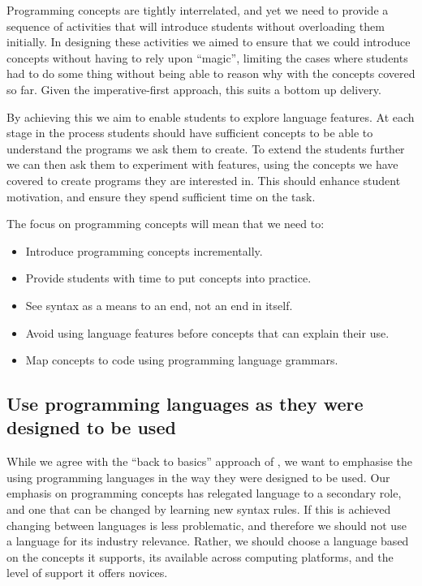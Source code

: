 Programming concepts are tightly interrelated, and yet we need to provide a sequence of activities that will introduce students without overloading them initially. In designing these activities we aimed to ensure that we could introduce concepts without having to rely upon ``magic'', limiting the cases where students had to do some thing without being able to reason why with the concepts covered so far. Given the imperative-first approach, this suits a bottom up delivery. 

By achieving this we aim to enable students to explore language features. At each stage in the process students should have sufficient concepts to be able to understand the programs we ask them to create. To extend the students further we can then ask them to experiment with features, using the concepts we have covered to create programs they are interested in. This should enhance student motivation, and ensure they spend sufficient time on the task.

The focus on programming concepts will mean that we need to:
\begin{itemize}
	\item Introduce programming concepts incrementally.
	\item Provide students with time to put concepts into practice.
	\item See syntax as a means to an end, not an end in itself.
	\item Avoid using language features before concepts that can explain their use.
	\item Map concepts to code using programming language grammars.
\end{itemize} 


\subsection{Use programming languages as they were designed to be used} %
\label{ssub:use_programming_languages_as_they_were_designed_to_be_used}

While we agree with the ``back to basics'' approach of \citet{Reges:2006}, we want to emphasise the using programming languages in the way they were designed to be used. Our emphasis on programming concepts has relegated language to a secondary role, and one that can be changed by learning new syntax rules. If this is achieved changing between languages is less problematic, and therefore we should not use a language for its industry relevance. Rather, we should choose a language based on the concepts it supports, its available across computing platforms, and the level of support it offers novices.

